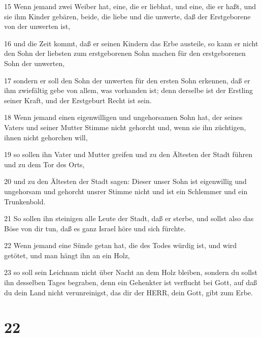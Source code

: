 \par 15 Wenn jemand zwei Weiber hat, eine, die er liebhat, und eine, die er haßt, und sie ihm Kinder gebären, beide, die liebe und die unwerte, daß der Erstgeborene von der unwerten ist,
\par 16 und die Zeit kommt, daß er seinen Kindern das Erbe austeile, so kann er nicht den Sohn der liebsten zum erstgeborenen Sohn machen für den erstgeborenen Sohn der unwerten,
\par 17 sondern er soll den Sohn der unwerten für den ersten Sohn erkennen, daß er ihm zwiefältig gebe von allem, was vorhanden ist; denn derselbe ist der Erstling seiner Kraft, und der Erstgeburt Recht ist sein.
\par 18 Wenn jemand einen eigenwilligen und ungehorsamen Sohn hat, der seines Vaters und seiner Mutter Stimme nicht gehorcht und, wenn sie ihn züchtigen, ihnen nicht gehorchen will,
\par 19 so sollen ihn Vater und Mutter greifen und zu den Ältesten der Stadt führen und zu dem Tor des Orts,
\par 20 und zu den Ältesten der Stadt sagen: Dieser unser Sohn ist eigenwillig und ungehorsam und gehorcht unsrer Stimme nicht und ist ein Schlemmer und ein Trunkenbold.
\par 21 So sollen ihn steinigen alle Leute der Stadt, daß er sterbe, und sollst also das Böse von dir tun, daß es ganz Israel höre und sich fürchte.
\par 22 Wenn jemand eine Sünde getan hat, die des Todes würdig ist, und wird getötet, und man hängt ihn an ein Holz,
\par 23 so soll sein Leichnam nicht über Nacht an dem Holz bleiben, sondern du sollst ihn desselben Tages begraben, denn ein Gehenkter ist verflucht bei Gott, auf daß du dein Land nicht verunreinigst, das dir der HERR, dein Gott, gibt zum Erbe.

\chapter{22}

